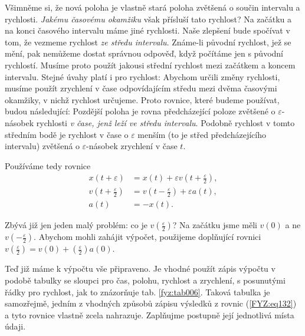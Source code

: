     Všimněme si, že nová poloha je vlastně stará poloha zvětšená o součin intervalu a rychlosti. 
    \emph{Jakému časovému okamžiku} však přísluší tato rychlost? Na začátku a na konci časového 
    intervalu máme jiné rychlosti. Naše zlepšení bude spočívat v tom, že vezmeme rychlost \emph{ze 
    středu intervalu}. Známe-li původní rychlost, jež se mění, pak nemůžeme dostat správnou 
    odpověď, když počítáme jen s původní rychlostí. Musíme proto použít jakousi střední rychlost 
    mezi začátkem a koncem intervalu. Stejné úvahy platí i pro rychlost: Abychom určili změny 
    rychlosti, musíme použít zrychlení v čase odpovídajícím středu mezi dvěma časovými okamžiky, v 
    nichž rychlost určujeme. Proto rovnice, které budeme používat, budou následující: Pozdější 
    poloha je rovna předcházející poloze zvětšené o \(\varepsilon\)-násobek rychlosti \emph{v čase, 
    jenž leží ve středu intervalu}. Podobně rychlost v tomto středním bodě je rychlost v čase o 
    \(\varepsilon\) menším (to je střed předcházejícího intervalu) zvětšená o 
    \(\varepsilon\)-násobek zrychlení v čase \(t\).
    
    Používáme tedy rovnice
    \begin{subequations}
      \label{FYZ:eq132} 
      \begin{align}
      x(t+\varepsilon) 
           &= x(t) + \varepsilon v\left(t+\frac{\varepsilon}{2}\right), \label{FYZ:eq132a} \\
      v(t+\frac{\varepsilon}{2}) 
           &= v\left(t-\frac{\varepsilon}{2}\right) + \varepsilon a(t), \label{FYZ:eq132b} \\
      a(t) &= -x(t).                                                    \label{FYZ:eq132c}
      \end{align}
    \end{subequations}
    
    Zbývá již jen jeden malý problém: co je \(v(\frac{\varepsilon}{2})\)? Na začátku jsme měli 
    \(v(0)\) a ne \(v(-\frac{\varepsilon}{2})\). Abychom mohli zahájit výpočet, použijeme 
    doplňující rovnici \(v(\frac{\varepsilon}{2}) = v(0) + (\frac{\varepsilon}{2})a(0)\).
    
    Teď již máme k výpočtu vše připraveno. Je vhodné použít zápis výpočtu v podobě tabulky se 
    sloupci pro čas, polohu, rychlost a zrychlení, s posunutými řádky pro rychlost, jak to 
    znázorňuje tab. \ref{fyz:tab006}. Taková tabulka je samozřejmě, jedním z vhodných způsobů 
    zápisu výsledků z  rovnic (\ref{FYZ:eq132}) a tyto rovnice vlastně zcela nahrazuje. Zaplňujme 
    postupně její jednotlivá místa údaji.
    
